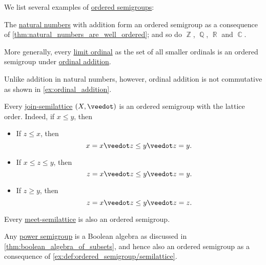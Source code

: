 \begin{example}\label{ex:def:ordered_semigroup}
  We list several examples of \hyperref[def:ordered_semigroup]{ordered semigroups}:

  \begin{thmenum}
     The \hyperref[def:natural_numbers]{natural numbers} with addition form an ordered semigroup as a consequence of \cref{thm:natural_numbers_are_well_ordered}; and so do \( \BbbZ \), \( \BbbQ \), \( \BbbR \) and \( \BbbC \).

     More generally, every \hyperref[def:successor_and_limit_ordinal]{limit ordinal} as the set of all smaller ordinals is an ordered semigroup under \hyperref[def:ordinal_arithmetic/addition]{ordinal addition}.

    Unlike addition in natural numbers, however, ordinal addition is not commutative as shown in \cref{ex:ordinal_addition}.

     Every \hyperref[def:semilattice]{join-semilattice} \( (X, \synvee) \) is an ordered semigroup with the lattice order. Indeed, if \( x \leq y \), then
    \begin{itemize}
      \item If \( z \leq x \), then
      \begin{equation*}
        x = x \synvee z \leq y \synvee z = y.
      \end{equation*}

      \item If \( x \leq z \leq y \), then
      \begin{equation*}
        z = x \synvee z \leq y \synvee z = y.
      \end{equation*}

      \item If \( z \geq y \), then
      \begin{equation*}
        z = x \synvee z \leq y \synvee z = z.
      \end{equation*}
    \end{itemize}

    Every \hyperref[def:semilattice]{meet-semilattice} is also an ordered semigroup.

     Any \hyperref[def:power_semigroup]{power semigroup} is a Boolean algebra as discussed in \cref{thm:boolean_algebra_of_subsets}, and hence also an ordered semigroup as a consequence of \cref{ex:def:ordered_semigroup/semilattice}.
  \end{thmenum}
\end{example}

